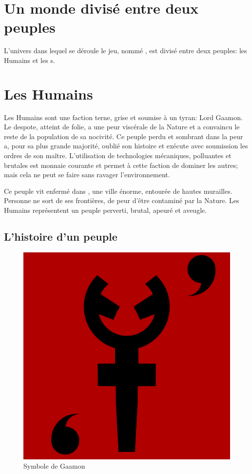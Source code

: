 \section{Un monde divisé entre deux peuples}
L'univers dans lequel se déroule le jeu, nommé \nomUnivers, est divisé entre deux peuples: les Humains et les \nomNaturels s.



\section{Les Humains}
Les Humains sont une faction terne, grise et soumise à un tyran: Lord Gaamon. Le despote, atteint de folie, a une peur viscérale de la Nature et a convaincu le reste de la population de sa nocivité. Ce peuple perdu et sombrant dans la peur a, pour sa plus grande majorité, oublié son histoire et exécute avec soumission les ordres de son maître. L'utilisation de technologies mécaniques, polluantes et brutales est monnaie courante et permet à cette faction de dominer les autres; mais cela ne peut se faire sans ravager l'environnement.

Ce peuple vit enfermé dans \nomVille, une ville énorme, entourée de hautes murailles. Personne ne sort de ses frontières, de peur d'être contaminé par la Nature. Les Humains représentent un peuple perverti, brutal, apeuré et aveugle.


\subsection{L'histoire d'un peuple}
\begin{figure}
	\vspace*{-.8cm}
	\center
	\includegraphics[width=\linewidth]{images/Monde/drapeauGaamon.png}
	\caption{Symbole de Gaamon}
\end{figure}

